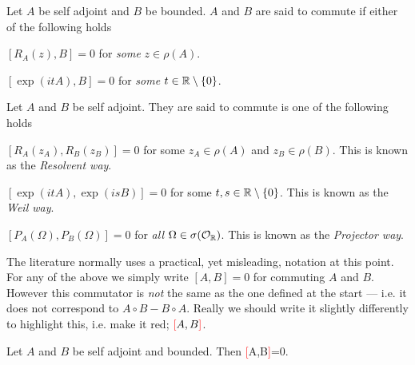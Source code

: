 \bd
Let $A$ be self adjoint and $B$ be bounded. $A$ and $B$ are said to commute if either of the following holds
\ben[label=(\roman*)]
\item $[R_A(z),B] =0 $ for \emph{some} $z\in\rho(A)$.
\item $[\exp(itA),B] = 0$ for \emph{some} $t\in\mathbb{R}\setminus\{0\}$.
\een 
\ed 

\bd
Let $A$ and $B$ be self adjoint. They are said to commute is one of the following holds
\ben[label=(\roman*)]
\item $[R_A(z_A), R_B(z_B)]=0$ for some $z_A\in\rho(A)$ and $z_B\in\rho(B)$. This is known as the \emph{Resolvent way}.
\item $[\exp(itA),\exp(isB)]=0$ for some $t,s\in\mathbb{R}\setminus\{0\}$. This is known as the \emph{Weil way}. 
\item $[P_A(\Omega),P_B(\Omega)] = 0 $ for \emph{all} $\Omega\in\sigma(\mathcal{O}_{\mathbb{R}})$. This is known as the \emph{Projector way}.
\een 
\ed 

\br 
The literature normally uses a practical, yet misleading, notation at this point. For any of the above we simply write $[A,B]=0$ for commuting $A$ and $B$. However this commutator is \emph{not} the same as the one defined at the start --- i.e. it does not correspond to $A\circ B - B\circ A$. Really we should write it slightly differently to highlight this, i.e. make it red; $\textcolor{red}{[}A,B\textcolor{red}{]}$.
\er 

\bt 
Let $A$ and $B$ be self adjoint and bounded. Then 
 \quad \Leftrightarrow \quad \textcolor{red}{[}A,B\textcolor{red}{]}=0.
\ese 
\et 